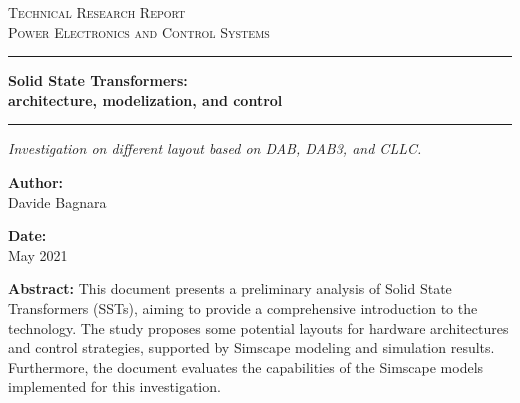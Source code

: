 \documentclass[12pt,a4paper]{scrartcl}
\newcommand{\DocCategory}{Technical Research Report}
\newcommand{\DocField}{Power Electronics and Control Systems}
\newcommand{\DocTitle}{%
	Solid State Transformers: \\[12pt]
	\huge architecture, modelization, and control
}
\newcommand{\DocSubtitle}{%
	Investigation on different layout based on DAB, DAB3, and CLLC. 
}
\newcommand{\DocAuthor}{Davide Bagnara}
\newcommand{\DocDate}{May 2021}
\newcommand{\DocAbstract}{%
	This document presents a preliminary analysis of Solid State Transformers (SSTs), aiming to provide a comprehensive introduction to the technology. The study proposes some potential layouts for hardware architectures and control strategies, supported by Simscape modeling and simulation results. Furthermore, the document evaluates the capabilities of the Simscape models implemented for this investigation. 
}
\begin{document}
	\titlepage
	\begin{center}
		{\Large\scshape \DocCategory}\\[8pt]
		{\large\scshape \DocField}
	\end{center}
	
	\vspace{36pt}
	\noindent\rule{\linewidth}{0.8pt}
	
	\begin{center}
		{\fontsize{30}{30}\selectfont\bfseries \DocTitle}
	\end{center}
	
	\vspace{4pt}
	\noindent\rule{\linewidth}{2.2pt}
	
	\begin{center}
		\begin{onehalfspace}
			{\large\itshape \DocSubtitle}
		\end{onehalfspace}
	\end{center}
	
	\vspace{36pt}
	
	\begin{minipage}{0.92\linewidth}
		\noindent
		\begin{minipage}[t]{0.48\linewidth}
			\textbf{Author:}\\[2pt]
			\DocAuthor
		\end{minipage}%
		\hfill
		\begin{minipage}[t]{0.48\linewidth}
			\raggedleft
			\textbf{Date:}\\[2pt]
			\DocDate
		\end{minipage}
	\end{minipage}
	\vspace{36pt}
	
	\begin{center}
		\begin{minipage}{0.85\linewidth}
			\footnotesize 
			\begin{onehalfspace}
				\textbf{Abstract:} \DocAbstract
			\end{onehalfspace}
		\end{minipage}
	\end{center}
	
\end{document}
